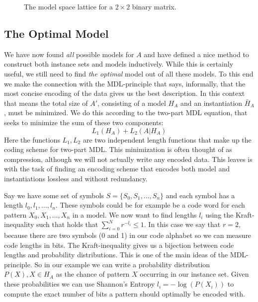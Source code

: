 \documentclass{llncs}
\begin{document}
\begin{figure}
\caption{The model space lattice for a $2\times 2$ binary matrix.}
\label{lattice}
\end{figure}

\subsection{The Optimal Model}

We have now found \emph{all} possible models for $A$ and have defined a nice method to construct both instance sets and models inductively. While this is certainly useful, we still need to find \emph{the optimal} model out of all these models. To this end we make the connection with the MDL-principle that says, informally, that the most concise encoding of the data gives us the best description. In this context that means the total size of $A'$, consisting of a model $H_A$ and an instantiation $\bar{H}_A$, must be minimized. We do this according to the two-part MDL equation, that seeks to minimize the sum of these two components:
$$
L_1(H_A) + L_2(A|H_A)
$$
Here the functions $L_1, L_2$ are two independent length functions that make up the coding scheme for two-part MDL. This minimization is often thought of as compression, although we will not actually write any encoded data. This leaves is with the task of finding an encoding scheme that encodes both model and instantiations lossless and without redundancy.

Say we have some set of symbols $S=\{S_0,S_1,\dots,S_n\}$ and each symbol has a length $l_0,l_1,\dots,l_n$. These symbols could be for example be a code word for each pattern $X_0, X_1,\dots,X_n$ in a model. We now want to find lengths $l_i$ using the Kraft-inequality such that holds that $\displaystyle\sum^N_{i=0}r^{-l_i} \leq 1$. In this case we say that $r=2$, because there are two symbols (0 and 1) in our code alphabet so we can measure code lengths in bits. 
The Kraft-inequality gives us a bijection between code lengths and probability distributions. This is one of the main ideas of the MDL-principle. So in our example we can write a probability distribution $P(X), X \in H_A$ as the chance of pattern $X$ occurring in our instance set. Given these probabilities we can use Shannon's Entropy $l_i=-\log(P(X_i))$ to compute the exact number of bits a pattern should optimally be encoded with.
\end{document}
